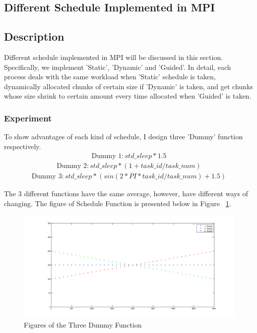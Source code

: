 \documentclass[a4paper]{article}   %
\begin{document}
\begin{CJK}{UTF8}{gbsn}
\begin{spacing}{1.2}
\section{Different Schedule Implemented in MPI}
\subsection{Description}
Different schedule implemented in MPI will be discussed in this section. Specifically, we implement 'Static', 'Dynamic' and 'Guided'. In detail, each process deals with the same workload when 'Static' schedule is taken, dynamically allocated chunks of certain size if 'Dynamic' is taken, and get chunks whose size shrink to certain amount every time allocated when 'Guided' is taken. 

\subsubsection{Experiment}
To show advantages of each kind of schedule, I design three 'Dummy' function respectively. 
\begin{align}
\text{Dummy 1}: std\_sleep*1.5
\end{align}
\begin{align}
\text{Dummy 2}: std\_sleep*(1+task\_id/task\_num)
\end{align}
\begin{align}
\text{Dummy 3}: std\_sleep*(sin(2*PI*task\_id/task\_num) + 1.5)
\end{align}

The 3 different functions have the same average, however, have different ways of changing. The figure of Schedule Function is presented below in Figure ~\ref{fig:prob2_schedule}.

\begin{figure}[htbp]
\centering
\includegraphics[width=12cm]{figs/prob2_schedule.png}
\caption{Figures of the Three Dummy Function}
\label{fig:prob2_schedule}
\end{figure}


\end{spacing}
\end{CJK}
\end{document}

